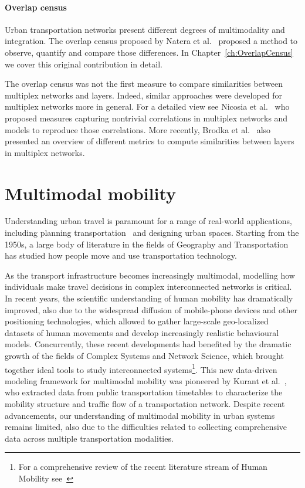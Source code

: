 \paragraph*{Overlap census}\label{overlap}
Urban transportation networks present different degrees of multimodality and integration. The overlap census proposed by Natera et al.~\cite{natera2020multimodal} proposed a method to observe, quantify and compare those differences. In Chapter~\ref{ch:OverlapCensus} we cover this original contribution in detail.

The overlap census was not the first measure to compare similarities between multiplex networks and layers. Indeed, similar approaches were developed for multiplex networks more in general. For a detailed view see Nicosia et al.~\cite{nicosia2015measuring} who proposed measures capturing nontrivial correlations in multiplex networks and models to reproduce those correlations. More recently, Brodka et al.~\cite{brodka2017similarity} also presented an overview of different metrics to compute similarities between layers in multiplex networks. 


\section{Multimodal mobility}\label{sec:multimodalmobility}

Understanding urban travel is paramount for a range of real-world applications, including planning transportation~\cite{patriksson2015traffic} and designing urban spaces. Starting from the 1950s, a large body of literature in the fields of Geography and Transportation has studied how people move and use transportation technology. 

As the transport infrastructure becomes increasingly multimodal, modelling how individuals make travel decisions in complex interconnected networks is critical. In recent years, the scientific understanding of human mobility has dramatically improved, also due to the widespread diffusion of mobile-phone devices and other positioning technologies, which allowed to gather large-scale geo-localized datasets of human movements and develop increasingly realistic behavioural models. Concurrently, these recent developments had benefited by the dramatic growth of the fields of Complex Systems and Network Science, which brought together ideal tools to study interconnected systems\footnote{For a comprehensive review of the recent literature stream of Human Mobility see~\cite{barbosa2018human}}. This new data-driven modeling framework for multimodal mobility was pioneered by Kurant et al.~\cite{kurant2006extraction}, who extracted data from public transportation timetables to characterize the mobility structure and traffic flow of a transportation network. Despite recent advancements, our understanding of multimodal mobility in urban systems remains limited, also due to the difficulties related to collecting comprehensive data across multiple transportation modalities. 

